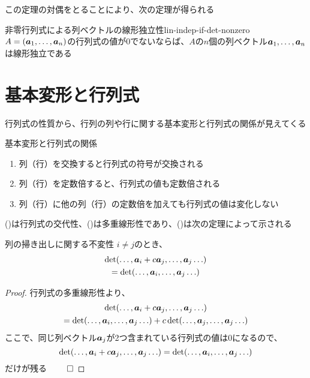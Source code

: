\documentclass[../../../topic_linear-algebra]{subfiles}
\begin{document}
この定理の対偶をとることにより、次の定理が得られる

\begin{theorem}{非零行列式による列ベクトルの線形独立性}{lin-indep-if-det-nonzero}
  $A = (\vb*{a}_1, \ldots, \vb*{a}_n)$の行列式の値が0でないならば、$A$の$n$個の列ベクトル$\vb*{a}_1, \ldots, \vb*{a}_n$は線形独立である
\end{theorem}

\sectionline
\section{基本変形と行列式}

行列式の性質から、行列の列や行に関する基本変形と行列式の関係が見えてくる

\begin{theorem*}{基本変形と行列式の関係}
  \begin{enumerate}[label=\romanlabel]
    \item 列（行）を交換すると行列式の符号が交換される
    \item 列（行）を定数倍すると、行列式の値も定数倍される
    \item 列（行）に他の列（行）の定数倍を加えても行列式の値は変化しない
  \end{enumerate}
\end{theorem*}

()は行列式の交代性、()は多重線形性であり、()は次の定理によって示される

\begin{theorem*}{列の掃き出しに関する不変性}
  $i \neq j$のとき、
  \begin{multline*}
    \det(\ldots, \vb*{a}_i + c \vb*{a}_j,\ldots, \vb*{a}_j \ldots) \\= \det(\ldots, \vb*{a}_i,\ldots, \vb*{a}_j \ldots)
  \end{multline*}
\end{theorem*}

\begin{proof}
  行列式の多重線形性より、
  \begin{multline*}
    \det(\ldots, \vb*{a}_i + c \vb*{a}_j,\ldots, \vb*{a}_j \ldots) \\
    = \det(\ldots, \vb*{a}_i,\ldots, \vb*{a}_j \ldots) + c\det(\ldots, \vb*{a}_j,\ldots, \vb*{a}_j \ldots)
  \end{multline*}
  ここで、同じ列ベクトル$\vb*{a}_j$が2つ含まれている行列式の値は0になるので、
  \begin{equation*}
    \det(\ldots, \vb*{a}_i + c \vb*{a}_j,\ldots, \vb*{a}_j \ldots) = \det(\ldots, \vb*{a}_i,\ldots, \vb*{a}_j \ldots)
  \end{equation*}
  だけが残る $\qed$
\end{proof}
\end{document}
